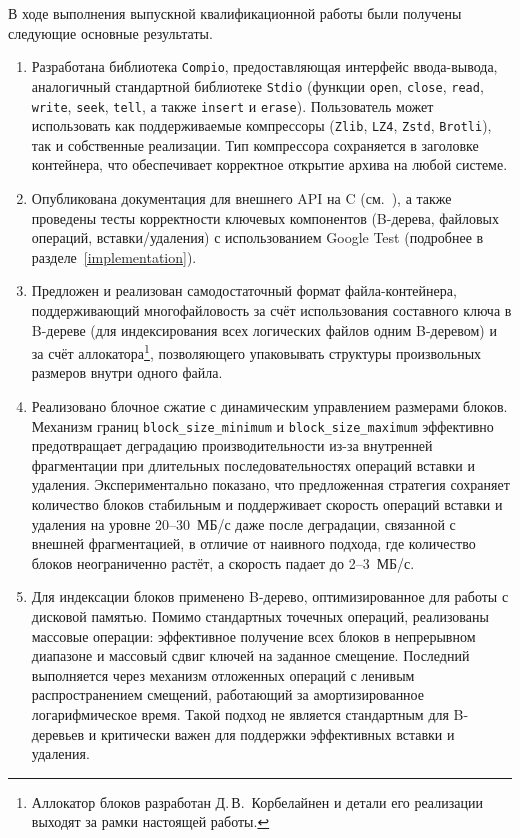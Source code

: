  \label{conclusion1}

В ходе выполнения выпускной квалификационной работы были получены следующие основные результаты.

\begin{enumerate} %
    \item Разработана библиотека \texttt{Compio}, предоставляющая интерфейс ввода-вывода, аналогичный стандартной библиотеке \texttt{Stdio} (функции \texttt{open}, \texttt{close}, \texttt{read}, \texttt{write}, \texttt{seek}, \texttt{tell}, а также \texttt{insert} и \texttt{erase}). Пользователь может использовать как поддерживаемые компрессоры (\texttt{Zlib}, \texttt{LZ4}, \texttt{Zstd}, \texttt{Brotli}), так и собственные реализации. Тип компрессора сохраняется в заголовке контейнера, что обеспечивает корректное открытие архива на любой системе.

    \item Опубликована документация для внешнего API на C (см.~\cite{compio_docs}), а также проведены тесты корректности ключевых компонентов (B-дерева, файловых операций, вставки/удаления) с использованием Google Test (подробнее в разделе~\ref{implementation}). 

    \item Предложен и реализован самодостаточный формат файла-контейнера, поддерживающий многофайловость за счёт использования составного ключа в B-дереве (для индексирования всех логических файлов одним B-деревом) и за счёт аллокатора\footnote{Аллокатор блоков разработан Д.\,В.~Корбелайнен и детали его реализации выходят за рамки настоящей работы.}, позволяющего упаковывать структуры произвольных размеров внутри одного файла.

    \item Реализовано блочное сжатие с динамическим управлением размерами блоков. Механизм границ \texttt{block\_size\_minimum} и \texttt{block\_size\_maximum} эффективно предотвращает деградацию производительности из-за внутренней фрагментации при длительных последовательностях операций вставки и удаления. Экспериментально показано, что предложенная стратегия сохраняет количество блоков стабильным и поддерживает скорость операций вставки и удаления на уровне 20--30~МБ/с даже после деградации, связанной с внешней фрагментацией, в отличие от наивного подхода, где количество блоков неограниченно растёт, а скорость падает до 2--3~МБ/с.

    \item Для индексации блоков применено B-дерево, оптимизированное для работы с дисковой памятью. Помимо стандартных точечных операций, реализованы массовые операции: эффективное получение всех блоков в непрерывном диапазоне и массовый сдвиг ключей на заданное смещение. Последний выполняется через механизм отложенных операций с ленивым распространением смещений, работающий за амортизированное логарифмическое время. Такой подход не является стандартным для B-деревьев и критически важен для поддержки эффективных вставки и удаления.


\end{enumerate}
